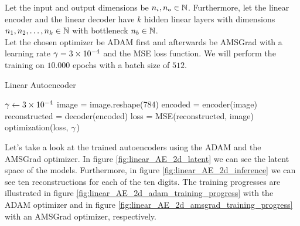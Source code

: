 \begin{algorithm}
Let the input and output dimensions be $n_i, n_o \in\operatorname{\mathbb{N}}$. Furthermore, let the linear encoder and the linear decoder have $k$ hidden linear layers with dimensions $n_1, n_2,\ldots, n_k\in\operatorname{\mathbb{N}}$ with bottleneck $n_b\in\operatorname{\mathbb{N}}$.\\
Let the chosen optimizer be ADAM first and afterwards be AMSGrad with a learning rate $\operatorname{\gamma}=\num{3e-4}$ and the MSE loss function. We will perform the training on $10.000$ epochs with a batch size of $512$.
\caption{Linear Autoencoder}\label{alg:linear_AE}
\begin{algorithmic}[1]
\Require $\operatorname{\gamma} \gets \num{3e-4}$
		\State image = image.reshape(784) 
	    \State encoded = encoder(image) 
		\State reconstructed = decoder(encoded) 
    	\State loss = MSE(reconstructed, image) 
	    \State optimization(loss, $\operatorname{\gamma}$) 
    \EndFor
\EndFor
\end{algorithmic}
\end{algorithm}


Let's take a look at the trained autoencoders using the ADAM and the AMSGrad optimizer. In figure \ref{fig:linear_AE_2d_latent} we can see the latent space of the models. Furthermore, in figure \ref{fig:linear_AE_2d_inference} we can see ten reconstructions for each of the ten digits. The training progresses are illustrated in figure \ref{fig:linear_AE_2d_adam_training_progress} with the ADAM optimizer and in figure \ref{fig:linear_AE_2d_amsgrad_training_progress} with an AMSGrad optimizer, respectively.


